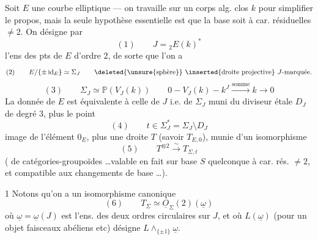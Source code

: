 
Soit $E$ une courbe elliptique --- on travaille sur un corps alg. clos $k$ pour simplifier le propos, mais la seule hypothèse essentielle est que la base soit à car. résiduelles $\ne2$. On désigne par 
\[
(1)\qquad J={}_2E(k)^*
\]
l'ens des pts de $E$ d'ordre $2$, de sorte que l'on a
\[
(2)\qquad E/\{\pm\operatorname{id}_E\}\simeq\Sigma_J
\qquad\text{\deleted{\unsure{sphère}} \inserted{droite projective} $J$-marquée.}
\]
\[
(3)\qquad\Sigma_J\simeq\mathbb P(V_J(k))
\qquad 0\mathbin{-}V_J(k)\mathbin{-}k^J\xrightarrow{\text{somme}}k\longrightarrow0
\]
La donnée de $E$ est équivalente à celle de $J$ i.e. de $\Sigma_J$ muni du diviseur étale $D_J$ de degré $3$, plus le point
\[
(4)\qquad t\in\Sigma_J^*=\Sigma_J\setminus D_J
\]
image de l'élément $0_E$, plus une droite $T$  (savoir $T_{E,0}$), munie d'un isomorphisme
\[
(5)\qquad T^{\otimes2}\xrightarrow{\sim}T_{\Sigma,t}
\]
(  de catégories-groupoïdes \ldots valable en fait sur base $S$ quelconque à car. rés. $\ne2$, et compatible aux changements de base \ldots).

1 Notons qu'on a un isomorphisme canonique
\[
(6)\qquad T_\Sigma\simeq\underline O_\Sigma(2)(\underline\omega)
\]
où $\underline\omega=\underline\omega(J)$ est l'ens. des deux ordres circulaires sur $J$, et où $L(\underline\omega)$ (pour un objet   faisceaux abéliens etc) désigne $L\wedge_{\{\pm1\}}\underline\omega$.
